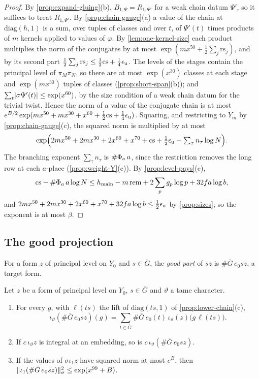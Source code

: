 \begin{proof}
By \cref{prop:expand-gluing}(b), $B_{1,\Psi}=R_{1,\Psi'}$ for a weak chain datum $\Psi'$, so it suffices to treat $R_{1,\Psi'}$. By \cref{prop:chain-gauge}(a) a value of the chain at $\mathrm{diag}(h,1)$ is a sum, over tuples of classes and over $t$, of $\Psi'(t)$ times products of $m$ kernels applied to values of $\varphi$. By \cref{lem:one-kernel-size} each product multiplies the norm of
the conjugates by at most $\exp(mx^{50}+\frac12\sum_j\mathrm{rs}_j)$, and by its second part $\frac12\sum_j\mathrm{rs}_j\le\frac12\mathrm{cs}+\frac14\epsilon_{\mathrm{u}}$. The levels of the stages contain the principal level of $\pi_M\pi_N$, so there are at most $\exp(x^{30})$ classes at each stage and $\exp(mx^{30})$ tuples of classes (\cref{prop:short-span}(b)); and
$\sum_t\lvert \sigma\Psi'(t)\rvert\le\exp(x^{60})$, by the size condition of a weak chain datum for the trivial twist. Hence the norm of a value of the conjugate chain is at most $e^{B/2}\exp(mx^{50}+mx^{30}+x^{60}+\frac12\mathrm{cs}+\frac14\epsilon_{\mathrm{u}})$. Squaring, and restricting to $Y_m$ by \cref{prop:chain-gauge}(c), the squared norm is multiplied by at most
\[
  \exp\Bigl(2mx^{50}+2mx^{30}+2x^{60}+x^{70}+\mathrm{cs}+\tfrac12\epsilon_{\mathrm{u}}-\textstyle\sum_\tau n_\tau\log N\Bigr).
\]
The branching exponent $\sum_\tau n_\tau$ is $\#\Phi_a\,a$, since the restriction removes the long row at each $a$-place (\cref{prop:weight-Y}(c)). By \cref{prop:level-pays}(c),
\[
  \mathrm{cs}-\#\Phi_a\,a\log N\le h_{\mathrm{main}}-m\,\mathrm{rem}+2\sum_pg_p\log p+32fa\log b ,
\]
and $2mx^{50}+2mx^{30}+2x^{60}+x^{70}+32fa\log b\le\frac12\epsilon_{\mathrm{u}}$ by \cref{prop:sizes}; so the exponent is at most $\beta$.
\end{proof}

\subsection{The good projection}\label{ss:good-projection}
For a form $z$ of principal level on $Y_0$ and $s\in\bar G$, the \emph{good part} of $sz$ is $\#\bar G\,e_0sz$, a target form.

\begin{proposition}\label{prop:good-projection}
Let $z$ be a form of principal level on $Y_0$, $s\in\bar G$ and $\vartheta$ a tame character.
\begin{enumerate}[label=\textup{(\alph*)}]
\item For every $g$, with $\ell(ts)$ the lift of $\mathrm{diag}(ts,1)$ of \cref{prop:lower-chain}(c),
\[
  \iota_\vartheta(\#\bar G\,e_0sz)(g)=\sum_{t\in\bar G}\#\bar G\,e_0(t)\,\iota_\vartheta(z)\bigl(g\,\ell(ts)\bigr).
\]
\item If $c\,\iota_\vartheta z$ is integral at an embedding, so is $c\,\iota_\vartheta(\#\bar G\,e_0sz)$.
\item If the values of $\sigma\iota_1z$ have squared norm at most $e^B$, then $\lVert \iota_1(\#\bar G\,e_0sz)\rVert_\sigma^2\le\exp(x^{99}+B)$.
\end{enumerate}
\end{proposition}

